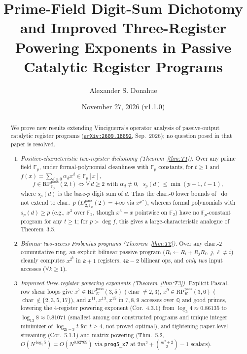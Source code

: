 \documentclass[11pt,reqno]{amsart}
\title[Prime-Field Digit-Sum Dichotomy and Improved Three-Register Powering]{%
  Prime-Field Digit-Sum Dichotomy and Improved Three-Register\\
  Powering Exponents in Passive Catalytic Register Programs}
\author{Alexander S. Donahue}
\date{November 27, 2026 (v1.1.0)}
\theoremstyle{definition}
\newcommand{\F}{\mathbb{F}}
\newcommand{\Q}{\mathbb{Q}}
\newcommand{\RP}{\mathrm{RP}}
\newcommand{\pass}{\mathrm{pass}}
\begin{document}
\begin{abstract}
We prove new results extending Vinciguerra's operator analysis of passive-output catalytic register programs (\href{https://arxiv.org/abs/2609.18692}{\texttt{arXiv:2609.18692}}, Sep.\ 2026); no question posed in that paper is resolved.
\begin{enumerate}
  \item \emph{Positive-characteristic two-register dichotomy (Theorem~\ref{thm:T1}).}
  Over any prime field $\F_p$, under formal-polynomial cleanliness with $\F_p$ constants, for $t \ge 1$ and $f(x) = \sum_{d \ge 0}\alpha_d x^d \in \F_p[x]$,
  \[
    f \in \RP_{\F_p}^{\pass}(2, t) \iff \forall\, d \ge 2 \text{ with } \alpha_d \neq 0,\;\; s_p(d) \le \min(p-1,\, t-1),
  \]
  where $s_p(d)$ is the base-$p$ digit sum of $d$.
  Thus the char.-$0$ lower bounds of~\cite[Thms.\ 3.2, 3.3, 3.5]{Vinciguerra2026} do not extend to char.\ $p$ ($D_{2,\F_p}^{\pass}(2) = +\infty$ via $x^{p^m}$), whereas formal polynomials with $s_p(d) \ge p$ (e.g., $x^3$ over $\F_2$, though $x^3 = x$ pointwise on $\F_2$) have no $\F_p$-constant program for any $t \ge 1$; for $p > \deg f$, this gives a large-characteristic analogue of Theorem~3.5.

  \item \emph{Bilinear two-access Frobenius programs (Theorem~\ref{thm:T2}).}
  Over any char.-$2$ commutative ring, an explicit bilinear passive program ($R_i \leftarrow R_i + R_j R_\ell$, $j,\ell \neq i$) cleanly computes $x^{2^k}$ in $k+1$ registers, $4k-2$ bilinear ops, and \emph{only two} input accesses ($\forall k \ge 1$).

  \item \emph{Improved three-register powering exponents (Theorem~\ref{thm:T3}).}
  Explicit Pascal-row shear loops give $x^7 \in \RP_K^{\pass}(3, 5)$ ($\operatorname{char} \neq 2, 3$), $x^9 \in \RP_K^{\pass}(3, 6)$ ($\operatorname{char} \notin \{2,3,5,17\}$), and $x^{11}, x^{13}, x^{15}$ in $7, 8, 9$ accesses over $\Q$ and good primes, lowering the $4$-register powering exponent (Cor.\ 4.3.1) from $\log_5 4 \approx 0.86135$ to $\log_{13} 8 \approx 0.81071$ (smallest among our constructed programs and unique integer minimizer of $\log_{2t-3} t$ for $t \ge 4$, not proved optimal), and tightening paper-level streaming (Cor.\ 5.1.1) and matrix powering (Thm.\ 5.2, $O(N^{\log_7 5}) = O(N^{0.82709})$ via \texttt{prog5\_x7} at $2m^2 + \binom{m^2+2}{2} - 1$ scalars).


\end{enumerate}
\end{abstract}
\end{document}
